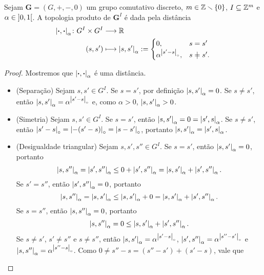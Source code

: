\begin{proposition}
\label{prop:grupo.comut.discreto.metrica}
Sejam $\bm G = (G,+,-,0)$ um grupo comutativo discreto, $m \in \mathbb{Z} \smallsetminus \{0\}$, $I \subseteq \mathbb{Z}^m$ e $\alpha \in \left]{0},{1}\right[$. A topologia produto de $\bm G^{I}$ é dada pela distância
	\begin{align*}
	\func{\dist{\var}{\var}_\alpha}{G^{I} \times G^{I}}{\R}{(s,s')}{
		\dist{s}{s'}_\alpha :=
			\begin{cases}
			0, & s = s'\\
			\alpha^{\ords{s'-s}}, & s \neq s'.
			\end{cases}
	}
	\end{align*}
\end{proposition}
\begin{proof}
Mostremos que $\left\vert{\bm{\cdot}},{\bm{\cdot}}\right\vert_\alpha$ é uma distância.
	\begin{itemize}
		\item (Separação) Sejam $s,s' \in G^{I}$. Se $s=s'$, por definição $\left\vert{s},{s'}\right\vert_\alpha = 0$. Se $s \neq s'$, então $\left\vert{s},{s'}\right\vert_\alpha = \alpha^{\left\vert{s'-s}\right\vert_{\circ}}$ e, como $\alpha>0$, $\left\vert{s},{s'}\right\vert_\alpha>0$.
		\item (Simetria) Sejam $s,s' \in G^{I}$. Se $s=s'$, então $\left\vert{s},{s'}\right\vert_\alpha = 0 = \left\vert{s'},{s}\right\vert_\alpha$. Se $s \neq s'$, então $\left\vert{s'-s}\right\vert_{\circ} = \left\vert{-(s'-s)}\right\vert_{\circ} = \left\vert{s-s'}\right\vert_{\circ}$, portanto $\left\vert{s},{s'}\right\vert_\alpha = \left\vert{s'},{s}\right\vert_\alpha$.
		\item (Desigualdade triangular) Sejam $s,s',s'' \in G^{I}$. Se $s = s'$, então $\left\vert{s},{s'}\right\vert_\alpha = 0$, portanto
			\begin{equation*}
			\left\vert{s},{s''}\right\vert_\alpha = \left\vert{s'},{s''}\right\vert_\alpha \leq 0 + \left\vert{s'},{s''}\right\vert_\alpha = \left\vert{s},{s'}\right\vert_\alpha + \left\vert{s'},{s''}\right\vert_\alpha.
			\end{equation*}
		Se $s' = s''$, então $\left\vert{s'},{s''}\right\vert_\alpha = 0$, portanto
			\begin{equation*}
			\left\vert{s},{s''}\right\vert_\alpha = \left\vert{s},{s'}\right\vert_\alpha \leq \left\vert{s},{s'}\right\vert_\alpha + 0 = \left\vert{s},{s'}\right\vert_\alpha + \left\vert{s'},{s''}\right\vert_\alpha.
			\end{equation*}
		Se $s=s''$, então $\left\vert{s},{s''}\right\vert_\alpha = 0$, portanto
			\begin{equation*}
			\left\vert{s},{s''}\right\vert_\alpha = 0 \leq \left\vert{s},{s'}\right\vert_\alpha + \left\vert{s'},{s''}\right\vert_\alpha.
			\end{equation*}
		Se $s \neq s'$, $s' \neq s''$ e $s \neq s''$, então $\left\vert{s},{s'}\right\vert_\alpha = \alpha^{\left\vert{s'-s}\right\vert_{\circ}}$, $\left\vert{s'},{s''}\right\vert_\alpha = \alpha^{\left\vert{s''-s'}\right\vert_{\circ}}$ e $\left\vert{s},{s''}\right\vert_\alpha = \alpha^{\left\vert{s''-s}\right\vert_{\circ}}$. Como $0 \neq s''-s = (s''-s') + (s'-s)$, vale que

\end{itemize}
\end{proof}
